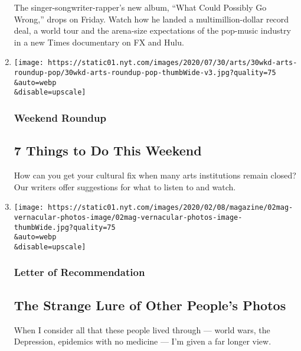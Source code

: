 \begin{enumerate}
  The singer-songwriter-rapper's new album, ``What Could Possibly Go
  Wrong,'' drops on Friday. Watch how he landed a multimillion-dollar
  record deal, a world tour and the arena-size expectations of the
  pop-music industry in a new Times documentary on FX and Hulu.
\item
  \href{/2020/07/30/arts/things-to-do-weekend-coronavirus.html}{}

  \texttt{[image: https://static01.nyt.com/images/2020/07/30/arts/30wkd-arts-roundup-pop/30wkd-arts-roundup-pop-thumbWide-v3.jpg?quality=75\\\&auto=webp\\\&disable=upscale]}

  \hypertarget{weekend-roundup}{%
  \subsubsection{Weekend Roundup}\label{weekend-roundup}}

  \hypertarget{7-things-to-do-this-weekend}{%
  \subsection{7 Things to Do This
  Weekend}\label{7-things-to-do-this-weekend}}

  How can you get your cultural fix when many arts institutions remain
  closed? Our writers offer suggestions for what to listen to and watch.
\item
  \href{/2020/07/30/magazine/the-strange-lure-of-other-peoples-photos.html}{}

  \texttt{[image: https://static01.nyt.com/images/2020/02/08/magazine/02mag-vernacular-photos-image/02mag-vernacular-photos-image-thumbWide.jpg?quality=75\\\&auto=webp\\\&disable=upscale]}

  \hypertarget{letter-of-recommendation}{%
  \subsubsection{Letter of
  Recommendation}\label{letter-of-recommendation}}

  \hypertarget{the-strange-lure-of-other-peoples-photos}{%
  \subsection{The Strange Lure of Other People's
  Photos}\label{the-strange-lure-of-other-peoples-photos}}

  When I consider all that these people lived through --- world wars,
  the Depression, epidemics with no medicine --- I'm given a far longer
  view.


\end{enumerate}
